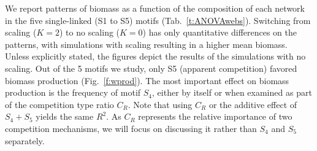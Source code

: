 \documentclass[12pt]{article}
\begin{document}
We report patterns of biomass as a function of the composition of each network
in the five single-linked (S1 to S5) motifs (Tab.~\ref{t:ANOVAwebs}). Switching
from scaling ($K = 2$) to no scaling ($K = 0$) has only quantitative differences
on the patterns, with simulations with scaling resulting in a higher mean
biomass. Unless explicitly stated, the figures depict the results of the
simulations with no scaling. Out of the 5 motifs we study, only S5 (apparent
competition) favored biomass production (Fig.~\ref{f:wprod}). The most important
effect on biomass production is the frequency of motif $S_{4}$, either by itself
or when examined as part of the competition type ratio $C_{R}$. Note that using
$C_{R}$ or the additive effect of $S_{4}+S_{5}$ yields the same $R^{2}$. As
$C_{R}$ represents the relative importance of two competition mechanisms, we
will focus on discussing it rather than $S_{4}$ and $S_{5}$ separately.
\end{document}
